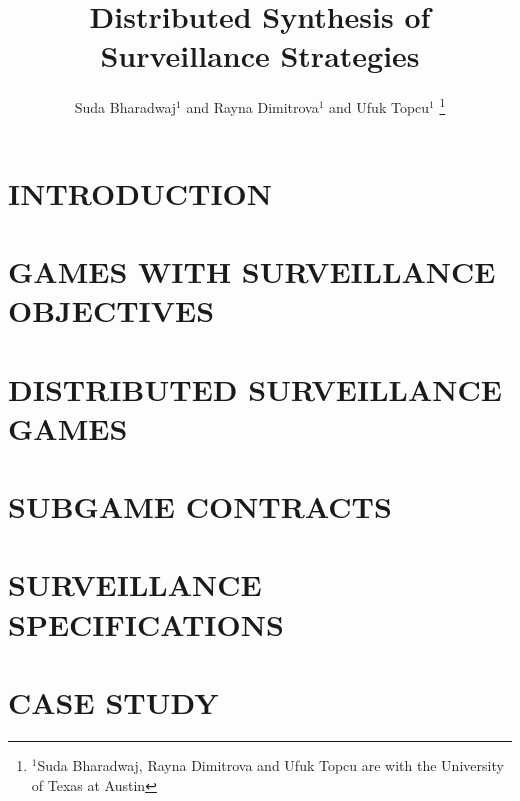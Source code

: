 \documentclass[letterpaper, 10 pt, conference]{ieeeconf}  %
\title{\LARGE \bf Distributed Synthesis of Surveillance Strategies}
\author{Suda Bharadwaj$^{1}$ and Rayna Dimitrova$^{1}$ and Ufuk Topcu$^{1}$%
\thanks{$^{1}$Suda Bharadwaj, Rayna Dimitrova and Ufuk Topcu are with the University of Texas at Austin}%
}
\begin{document}
\maketitle
\thispagestyle{empty}
\pagestyle{empty}


\begin{abstract}

\end{abstract}


\section{INTRODUCTION}




\section{GAMES WITH SURVEILLANCE OBJECTIVES}





\section{DISTRIBUTED SURVEILLANCE GAMES}


\section{SUBGAME CONTRACTS}


\section{SURVEILLANCE SPECIFICATIONS}


\section{CASE STUDY	}\label{sec:experiments}

\end{document}
